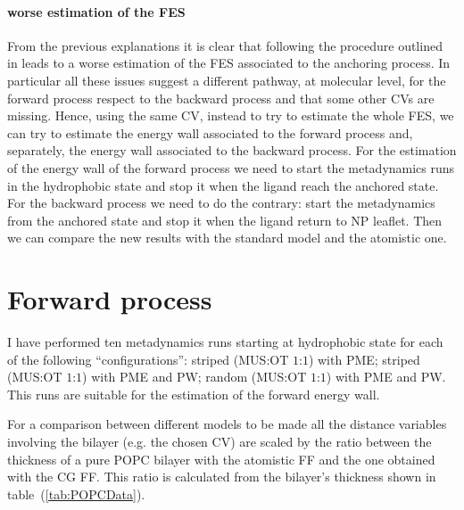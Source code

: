 \paragraph{\textbf{worse estimation of the FES}} From the previous explanations it is clear that following the procedure outlined in \cite{ourPaper} leads to a worse estimation of the \ac{FES} associated to the anchoring process. In particular all these issues suggest a different pathway, at molecular level, for the forward process respect to the backward process and that some other \acp{CV} are missing. Hence, using the same \ac{CV}, instead to try to estimate the whole \ac{FES}, we can try to estimate the energy wall associated to the forward process and, separately, the energy wall associated to the backward process. For the estimation of the energy wall of the forward process we need to start the metadynamics runs in the hydrophobic state and stop it when the ligand reach the anchored state. For the backward process we need to do the contrary: start the metadynamics from the anchored state and stop it when the ligand return to \ac{NP} leaflet. Then we can compare the new results with the standard \martini model and the atomistic one.

\section{Forward process}
I have performed ten metadynamics runs starting at hydrophobic state for each of the following ``configurations'': striped (\ac{MUS}:\ac{OT} $1$:$1$) with \ac{PME}; striped (\ac{MUS}:\ac{OT} $1$:$1$) with \ac{PME} and \ac{PW}; random (\ac{MUS}:\ac{OT} $1$:$1$) with \ac{PME} and \ac{PW}. This runs are suitable for the estimation of the forward energy wall.

For a comparison between different models to be made all the distance variables involving the bilayer (e.g. the chosen \ac{CV}) are scaled by the ratio between the thickness of a pure \ac{POPC} bilayer with the atomistic \ac{FF} and the one obtained with the \ac{CG} \ac{FF}. This ratio is calculated from the bilayer's thickness shown in table~(\ref{tab:POPCData}).
 
